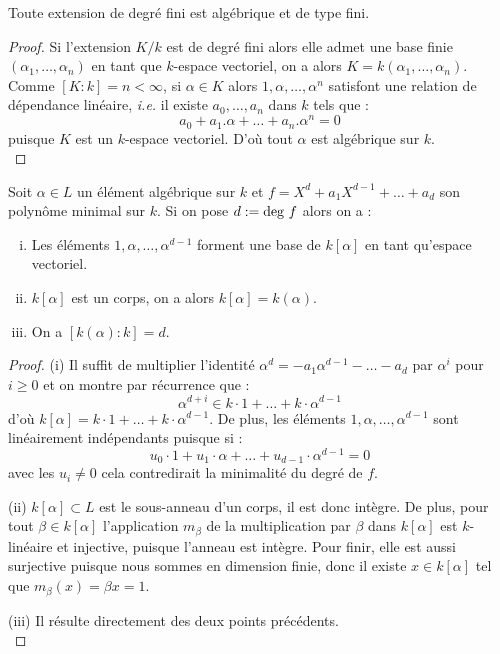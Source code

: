 \documentclass[a4paper]{article} %
\numberwithin{equation}{section}
\begin{document}
\begin{prop}
Toute extension de degré fini est algébrique et de type fini.
\end{prop}
\begin{proof}
Si l'extension $K/k$ est de degré fini alors elle admet une base finie 
$(\alpha_1,\dots,\alpha_n)$ en tant que $k$-espace vectoriel, on a alors $K 
= k(\alpha_1,\dots,\alpha_n)$. Comme $[K:k] = n < \infty$, si $\alpha\in K$ 
alors $1, \alpha, \dots, \alpha^n$ satisfont une relation de dépendance 
linéaire, \textit{i.e.} il existe $a_0, \dots, a_n$ dans $k$ tels que :
\[a_0 + a_1.\alpha + \dots + a_n.\alpha^n = 0\]
puisque $K$ est un $k$-espace vectoriel. D'où tout $\alpha$ est algébrique 
sur $k$.\\
\end{proof}

\begin{prop}
Soit $\alpha\in L$ un élément algébrique sur $k$ et $f = X^d + a_1X^{d-1} + 
\dots + a_d$ son polynôme minimal sur $k$. Si on pose $d := \textup{deg }f$ 
alors on a :
\begin{enumerate}[(i)]
\item Les éléments $1, \alpha,\dots,\alpha^{d-1}$ forment une base de 
$k[\alpha]$ en tant qu'espace vectoriel.
\item $k[\alpha]$ est un corps, on a alors $k[\alpha] = k(\alpha)$.
\item On a $[k(\alpha):k] = d$.
\end{enumerate}
\end{prop}

\begin{proof}
(i) Il suffit de multiplier l'identité $\alpha^d = -a_1\alpha^{d-1} - \dots 
- a_d$ par $\alpha^i$ pour $i\geq0$ et on montre par récurrence que :
\[\alpha^{d+i} \in k\cdot1 + \dots + k\cdot\alpha^{d-1}\]
d'où $k[\alpha] = k\cdot1 + \dots + k\cdot\alpha^{d-1}$. De plus, les éléments 
$1,\alpha,\dots,\alpha^{d-1}$ sont linéairement indépendants puisque si :
\[u_0\cdot1 + u_1\cdot\alpha + \dots + u_{d-1}\cdot\alpha^{d-1} = 0\]
avec les $u_i\neq0$ cela contredirait la minimalité du degré de $f$.\par
(ii) $k[\alpha] \subset L$ est le sous-anneau d'un corps, il est donc intègre. 
De plus, pour tout $\beta\in k[\alpha]$ l'application $m_{\beta}$ de la 
multiplication par $\beta$ dans $k[\alpha]$ est $k$-linéaire et injective, 
puisque l'anneau est intègre. Pour finir, elle est aussi surjective puisque 
nous sommes en dimension finie, donc il existe $x\in k[\alpha]$ tel que 
$m_{\beta}(x) = \beta x = 1$.\par
(iii) Il résulte directement des deux points précédents.\\
\end{proof}
\end{document}
